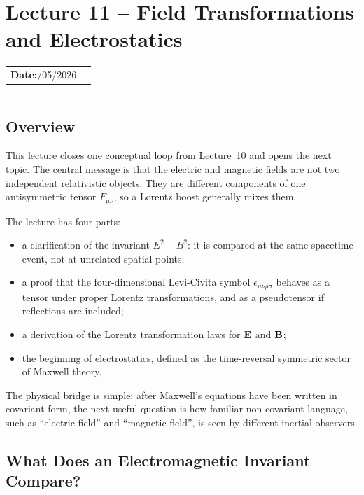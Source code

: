 \section{Lecture 11 -- Field Transformations and Electrostatics}\label{sec:lec11}

\begin{center}
\begin{tabular}{ll}
  \textbf{Date:}\quad 12/05/2026 & \\
\end{tabular}
\end{center}
\hrule\vspace{1.5em}

\subsection*{Overview}

This lecture closes one conceptual loop from Lecture~10 and opens the next topic.
The central message is that the electric and magnetic fields are not two independent
relativistic objects.  They are different components of one antisymmetric tensor
$F_{\mu\nu}$, so a Lorentz boost generally mixes them.

The lecture has four parts:
\begin{itemize}
  \item a clarification of the invariant $E^2-B^2$: it is compared at the same
        spacetime event, not at unrelated spatial points;
  \item a proof that the four-dimensional Levi-Civita symbol $\epsilon_{\mu\nu\rho\sigma}$
        behaves as a tensor under proper Lorentz transformations, and as a pseudotensor
        if reflections are included;
  \item a derivation of the Lorentz transformation laws for $\mathbf{E}$ and $\mathbf{B}$;
  \item the beginning of electrostatics, defined as the time-reversal symmetric sector
        of Maxwell theory.
\end{itemize}

The physical bridge is simple: after Maxwell's equations have been written in covariant
form, the next useful question is how familiar non-covariant language, such as
``electric field'' and ``magnetic field'', is seen by different inertial observers.

\subsection{What Does an Electromagnetic Invariant Compare?}\label{subsec:lec11-invariant-events}

